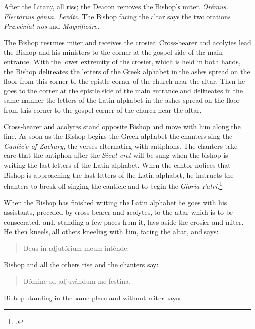\documentclass[letterpaper]{report}
\begin{document}
{    \rubric After the Litany, all rise; the Deacon removes the Bishop's miter.
    \textit{Or\'emus. Flectámus génua. Leváte.} The Bishop facing the altar says the
    two orations \textit{Pr\ae véniat nos} and \textit{Magnificáre.}

    \rubric The Bishop resumes miter and receives the crosier. Cross-bearer and
    acolytes lead the Bishop and his ministers to the corner at the gospel side
    of the main entrance. With the lower extremity of the crosier, which is
    held in both hands, the Bishop delineates the letters of the Greek alphabet
    in the ashes spread on the floor from this corner to the epistle corner of
    the church near the altar. Then he goes to the corner at the epistle side
    of the main entrance and delineates in the same manner the letters of the
    Latin alphabet in the ashes spread on the floor from this corner to the
    gospel corner of the church near the altar.

    Cross-bearer and acolytes stand opposite Bishop and move with him along the
    line. As soon as the Bishop begins the Greek alphabet the chanters sing the
    \textit{Canticle of Zachary,} the verses alternating with antiphons. The
    chanters take care that the antiphon after the \textit{Sicut erat} will be
    sung when the bishop is writing the last letters of the Latin alphabet.
    When the cantor notices that Bishop is approaching the last letters of the
    Latin alphabet, he instructs the chanters to break off singing the canticle
    and to begin the \textit{Gloria Patri.}\footcite[][p. 56.]{consecranda}

    \rubric When the Bishop has finished writing the Latin alphabet he goes
    with his assistants, preceded by cross-bearer and acolytes, to the altar
    which is to be consecrated, and, standing a few paces from it, lays aside
    the crosier and miter. He then kneels, all others kneeling with him, facing
    the altar, and says:

    \begin{quote}
        \vbar Deus in adjutórium meum inténde.
    \end{quote}

    Bishop and all the others rise and the chanters say:

    \begin{quote}
        \rbar Dómine ad adjuvándum me festína.
    \end{quote}

    Bishop standing in the same place and without miter says:

}
\end{document}
